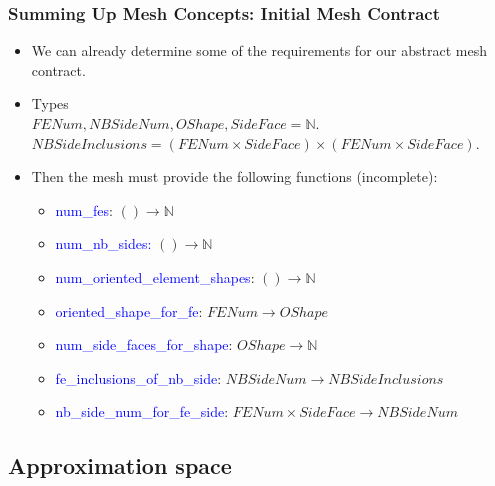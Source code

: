 \documentclass[compress]{beamer}
\begin{document}
\begin{frame}
  \frametitle{Summing Up Mesh Concepts: Initial Mesh Contract}
  \begin{itemize}[<+->]
    \item We can already determine some of the requirements for our abstract mesh contract.
    \item Types \\
      $FENum, NBSideNum, OShape, SideFace = \mathbb{N}$.\\
      $NBSideInclusions = (FENum \times SideFace) \times (FENum \times SideFace)$.
    \item Then the mesh must provide the following functions (incomplete):
      \begin{itemize}[<+->]
        \item \textcolor{blue}{num\_fes}: $() \rightarrow \mathbb{N}$
        \item \textcolor{blue}{num\_nb\_sides:} $() \rightarrow \mathbb{N}$
        \item \textcolor{blue}{num\_oriented\_element\_shapes}: $() \rightarrow \mathbb{N}$
        \item \textcolor{blue}{oriented\_shape\_for\_fe}:  $FENum \rightarrow OShape$
        \item \textcolor{blue}{num\_side\_faces\_for\_shape}: $OShape \rightarrow \mathbb{N}$
        \item \textcolor{blue}{fe\_inclusions\_of\_nb\_side}: $NBSideNum \rightarrow NBSideInclusions $
        \item \textcolor{blue}{nb\_side\_num\_for\_fe\_side}: $FENum \times SideFace \rightarrow NBSideNum$
      \end{itemize}
  \end{itemize}
\end{frame}

\subsection{Approximation space}
\end{document}

